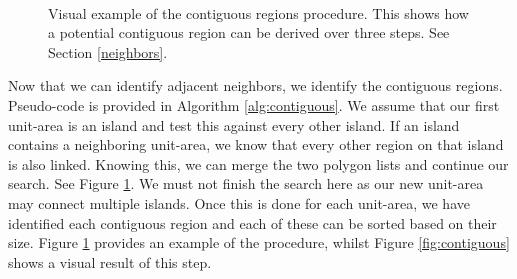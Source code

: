 \begin{figure}
\centering
{}~~~
~~~
~~~
\caption{ Visual example of the contiguous regions procedure. This shows how a potential contiguous region can be derived over three steps. See Section \ref{neighbors}.
} \label{fig:contiguousP} \vspace{-0.2cm}
\end{figure} 


Now that we can identify adjacent neighbors, we identify the contiguous regions. Pseudo-code is provided in Algorithm \ref{alg:contiguous}. We assume that our first unit-area is an island and test this against every other island. If an island contains a neighboring unit-area, we know that every other region on that island is also linked. Knowing this, we can merge the two polygon lists and continue our search. See Figure \ref{fig:contiguousP}. We must not finish the search here as our new unit-area may connect multiple islands. Once this is done for each unit-area, we have identified each contiguous region and each of these can be sorted based on their size. Figure \ref{fig:contiguousP} provides an example of the procedure, whilst Figure \ref{fig:contiguous} shows a visual result of this step.


